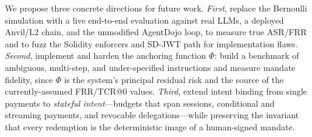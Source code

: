 \documentclass[10pt,twocolumn,letterpaper]{article}
\begin{document}
We propose three concrete directions for future work. \emph{First}, replace the Bernoulli simulation with a live end-to-end evaluation against real LLMs, a deployed Anvil/L2 chain, and the unmodified AgentDojo loop, to measure true ASR/FRR and to fuzz the Solidity enforcers and SD-JWT path for implementation flaws. \emph{Second}, implement and harden the anchoring function $\Phi$: build a benchmark of ambiguous, multi-step, and under-specified instructions and measure mandate fidelity, since $\Phi$ is the system's principal residual risk and the source of the currently-assumed FRR/TCR@0 values. \emph{Third}, extend intent binding from single payments to \emph{stateful intent}---budgets that span sessions, conditional and streaming payments, and revocable delegations---while preserving the invariant that every redemption is the deterministic image of a human-signed mandate.
\end{document}
